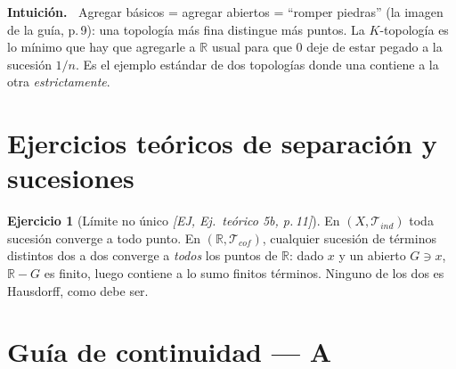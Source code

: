\documentclass[11pt,a4paper]{article}
\newenvironment{intuicion}{\begin{cajaint}\small\textbf{Intuición.\ }}{\end{cajaint}}
\newcommand{\figtit}[1]{\par\vspace{2pt}{\footnotesize\itshape #1}\par}
\theoremstyle{definition}
\newtheorem{ejercicio}[definicion]{Ejercicio}
\theoremstyle{plain}
\newcommand{\fnt}[1]{{\normalfont\small\itshape\color{gray!150!black}[#1]}}
\newcommand{\R}{\mathbb{R}}
\newcommand{\tp}{\mathcal{T}}
\begin{document}
\begin{figure}[ht]
\centering
{}
\figtit{Figura 7. La $K$-topología agrega el abierto $(-1,1)-K$, que contiene a $0$ pero a ningún $1/n$. En la topología usual eso es imposible: $0$ es punto de acumulación de $K$.}
\end{figure}

\begin{intuicion}
Agregar básicos = agregar abiertos = ``romper piedras'' (la imagen de la guía, p.\,9): una topología más fina distingue más puntos. La $K$-topología es lo mínimo que hay que agregarle a $\R$ usual para que $0$ deje de estar pegado a la sucesión $1/n$. Es el ejemplo estándar de dos topologías donde una contiene a la otra \emph{estrictamente}.
\end{intuicion}

\section{Ejercicios teóricos de separación y sucesiones}

\begin{ejercicio}[Límite no único \fnt{EJ, Ej.\ teórico 5b, p.\,11}]
En $(X,\tp_{ind})$ toda sucesión converge a todo punto. En $(\R,\tp_{cof})$, cualquier sucesión de términos distintos dos a dos converge a \emph{todos} los puntos de $\R$: dado $x$ y un abierto $G\ni x$, $\R-G$ es finito, luego contiene a lo sumo finitos términos. Ninguno de los dos es Hausdorff, como debe ser.
\end{ejercicio}

\section{Guía de continuidad --- A}
\end{document}
